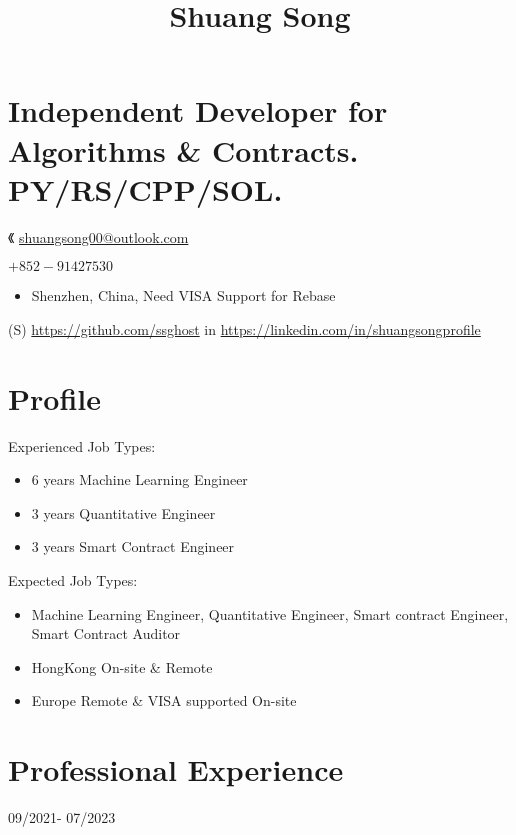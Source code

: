 \documentclass[10pt]{article}
\title{Shuang Song }
\author{}
\date{}
\begin{document}
\maketitle
\section*{Independent Developer for Algorithms \& Contracts. PY/RS/CPP/SOL.}
《 \href{mailto:shuangsong00@outlook.com}{shuangsong00@outlook.com}

$+852-91427530$

\begin{itemize}
  \item Shenzhen, China, Need VISA Support for Rebase
\end{itemize}

(S) \href{https://github.com/ssghost}{https://github.com/ssghost} in \href{https://linkedin.com/in/shuangsongprofile}{https://linkedin.com/in/shuangsongprofile}

\section*{Profile}
Experienced Job Types:

\begin{itemize}
  \item 6 years Machine Learning Engineer

  \item 3 years Quantitative Engineer

  \item 3 years Smart Contract Engineer

\end{itemize}

Expected Job Types:

\begin{itemize}
  \item Machine Learning Engineer, Quantitative Engineer, Smart contract Engineer, Smart Contract Auditor

  \item HongKong On-site \& Remote

  \item Europe Remote \& VISA supported On-site

\end{itemize}

\section*{Professional Experience}
09/2021- 07/2023
\end{document}
